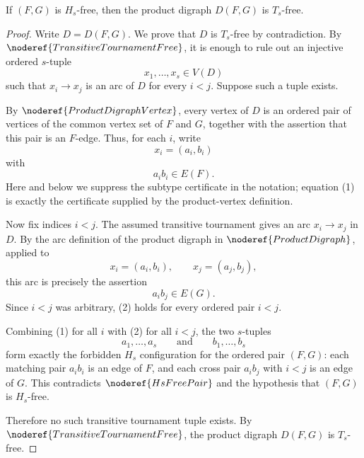 \begin{lemma}
If \((F,G)\) is \(H_s\)-free, then the product digraph \(D(F,G)\) is \(T_s\)-free.
\end{lemma}
\begin{proof}
Write \(D=D(F,G)\). We prove that \(D\) is \(T_s\)-free by contradiction. By \(\noderef{TransitiveTournamentFree}\), it is enough to rule out an injective ordered \(s\)-tuple
\[
  x_1,\ldots,x_s\in V(D)
\]
such that \(x_i\to x_j\) is an arc of \(D\) for every \(i<j\). Suppose such a tuple exists.

By \(\noderef{ProductDigraphVertex}\), every vertex of \(D\) is an ordered pair of vertices of the common vertex set of \(F\) and \(G\), together with the assertion that this pair is an \(F\)-edge. Thus, for each \(i\), write
\[
  x_i=(a_i,b_i)
\]
with
\[
  a_i b_i\in E(F). \tag{1}
\]
Here and below we suppress the subtype certificate in the notation; equation (1) is exactly the certificate supplied by the product-vertex definition.

Now fix indices \(i<j\). The assumed transitive tournament gives an arc \(x_i\to x_j\) in \(D\). By the arc definition of the product digraph in \(\noderef{ProductDigraph}\), applied to
\[
  x_i=(a_i,b_i),\qquad x_j=(a_j,b_j),
\]
this arc is precisely the assertion
\[
  a_i b_j\in E(G). \tag{2}
\]
Since \(i<j\) was arbitrary, (2) holds for every ordered pair \(i<j\).

Combining (1) for all \(i\) with (2) for all \(i<j\), the two \(s\)-tuples
\[
  a_1,\ldots,a_s
  \qquad\text{and}\qquad
  b_1,\ldots,b_s
\]
form exactly the forbidden \(H_s\) configuration for the ordered pair \((F,G)\): each matching pair \(a_i b_i\) is an edge of \(F\), and each cross pair \(a_i b_j\) with \(i<j\) is an edge of \(G\). This contradicts \(\noderef{HsFreePair}\) and the hypothesis that \((F,G)\) is \(H_s\)-free.

Therefore no such transitive tournament tuple exists. By \(\noderef{TransitiveTournamentFree}\), the product digraph \(D(F,G)\) is \(T_s\)-free.
\end{proof}
